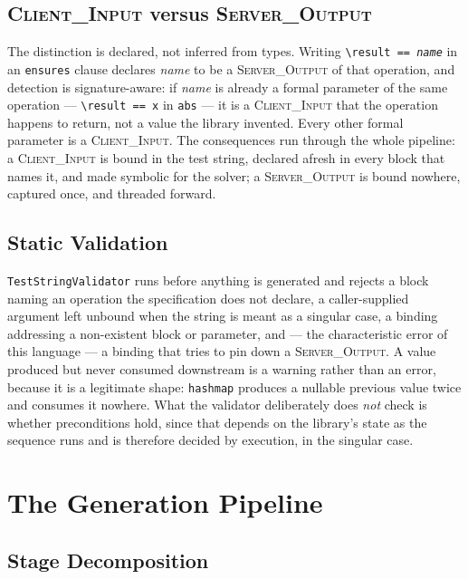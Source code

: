 \documentclass[conference]{IEEEtran}
\begin{document}
\subsection{\textsc{Client\_Input} versus \textsc{Server\_Output}}

The distinction is declared, not inferred from types. Writing
\texttt{\textbackslash result == \textit{name}} in an \texttt{ensures} clause
declares \textit{name} to be a \textsc{Server\_Output} of that operation, and
detection is signature-aware: if \textit{name} is already a formal parameter of the
same operation --- \texttt{\textbackslash result == x} in \texttt{abs} --- it is a
\textsc{Client\_Input} that the operation happens to return, not a value the library
invented. Every other formal parameter is a \textsc{Client\_Input}. The consequences
run through the whole pipeline: a \textsc{Client\_Input} is bound in the test string,
declared afresh in every block that names it, and made symbolic for the solver; a
\textsc{Server\_Output} is bound nowhere, captured once, and threaded forward.

\subsection{Static Validation}

\texttt{TestStringValidator} runs before anything is generated and rejects a block
naming an operation the specification does not declare, a caller-supplied argument
left unbound when the string is meant as a singular case, a binding addressing a
non-existent block or parameter, and --- the characteristic error of this language ---
a binding that tries to pin down a \textsc{Server\_Output}. A value produced but
never consumed downstream is a warning rather than an error, because it is a
legitimate shape: \texttt{hashmap} produces a nullable previous value twice and
consumes it nowhere. What the validator deliberately does \emph{not} check is
whether preconditions hold, since that depends on the library's state as the
sequence runs and is therefore decided by execution, in the singular case.

\section{The Generation Pipeline}
\label{sec:pipeline}

\subsection{Stage Decomposition}
\end{document}
